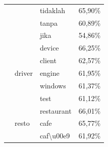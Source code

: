 \begin{longtable}[c]{|l|l|l|l|}
                                                                                                                           &                              & tidaklah                 & 65,90\%           \\ \cline{3-4}
                                                                                                                           &                              & tanpa                    & 60,89\%           \\ \cline{3-4}
                                                                                                                           &                              & jika                     & 54,86\%           \\ \cline{2-4}
                                                                                                                           & \multirow[t]{5}{*}{driver}   & device                   & 66,25\%           \\ \cline{3-4}
                                                                                                                           &                              & client                   & 62,57\%           \\ \cline{3-4}
                                                                                                                           &                              & engine                   & 61,95\%           \\ \cline{3-4}
                                                                                                                           &                              & windows                  & 61,37\%           \\ \cline{3-4}
                                                                                                                           &                              & test                     & 61,12\%           \\ \cline{2-4}
                                                                                                                           & \multirow[t]{5}{*}{resto}    & restaurant               & 66,01\%           \\ \cline{3-4}
                                                                                                                           &                              & cafe                     & 65,77\%           \\ \cline{3-4}
                                                                                                                           &                              & caf\textbackslash{}u00e9 & 61,92\%           \\ \cline{3-4}

\end{longtable}
